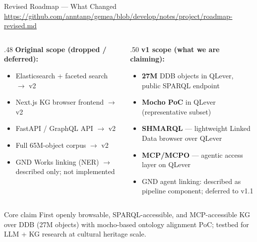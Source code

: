\documentclass[xcolor,aspectratio=169,compress]{beamer}
\begin{document}
\begin{frame}{Revised Roadmap --- What Changed}
  {\tiny\url{https://github.com/anntanp/gemea/blob/develop/notes/project/roadmap-revised.md}}
  \small
  \begin{columns}[t]
    \begin{column}{.48\textwidth}
      \textbf{Original scope (dropped / deferred):}
      \begin{itemize}\setlength{\itemsep}{2pt}
        \item[$\times$] Elasticsearch + faceted search $\to$ v2
        \item[$\times$] Next.js KG browser frontend $\to$ v2
        \item[$\times$] FastAPI / GraphQL API $\to$ v2
        \item[$\times$] Full 65M-object corpus $\to$ v2
        \item[$\times$] GND Works linking (NER) $\to$ described only; not implemented
      \end{itemize}
    \end{column}
    \begin{column}{.50\textwidth}
      \textbf{v1 scope (what we are claiming):}
      \begin{itemize}\setlength{\itemsep}{2pt}
        \item[$\checkmark$] \textbf{27M} DDB objects in QLever, public SPARQL endpoint
        \item[$\checkmark$] \textbf{Mocho PoC} in QLever (representative subset)
        \item[$\checkmark$] \textbf{SHMARQL} --- lightweight Linked Data browser over QLever
        \item[$\checkmark$] \textbf{MCP/MCPO} --- agentic access layer on QLever
        \item[$\circ$] GND agent linking: described as pipeline component; deferred to v1.1
      \end{itemize}
    \end{column}
  \end{columns}
  \smallskip
  \begin{block}{Core claim}
    \footnotesize First openly browsable, SPARQL-accessible, and MCP-accessible KG over DDB
    (27M objects) with mocho-based ontology alignment PoC; testbed for LLM + KG research
    at cultural heritage scale.
  \end{block}
\end{frame}
\end{document}
